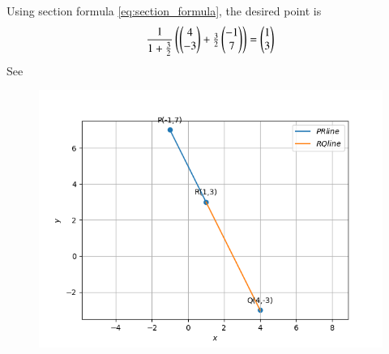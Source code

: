 Using section formula \eqref{eq:section_formula}, the desired point is
\begin{align}
\frac{1}{1+\frac{3}{2}}  \begin{pmatrix}\begin{pmatrix}
4\\
-3
\end{pmatrix}
  +
   \frac{3}{2}\begin{pmatrix}
-1\\
7
\end{pmatrix}\end{pmatrix}
=\begin{pmatrix}
1\\
3
\end{pmatrix}
\end{align}
See 
\begin{figure}[!h]
\begin{center}
   \includegraphics[width=\columnwidth]{chapters/10/7/2/1/figs/linefig.png}
\end{center}
\caption{}
\label{fig:chapters/10/7/2/1/Fig}
\end{figure}

